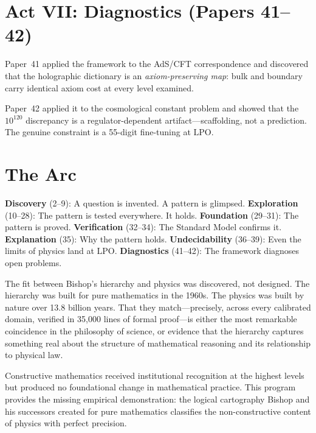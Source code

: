 \documentclass[11pt,a4paper]{report}
\theoremstyle{plain}
\theoremstyle{definition}
\theoremstyle{remark}
\newcommand{\LPO}{\mathrm{LPO}}
\begin{document}
\section*{Act VII: Diagnostics (Papers 41--42)}

Paper~41 applied the framework to the AdS/CFT correspondence and discovered that the holographic dictionary is an \emph{axiom-preserving map}: bulk and boundary carry identical axiom cost at every level examined.

Paper~42 applied it to the cosmological constant problem and showed that the $10^{120}$ discrepancy is a regulator-dependent artifact---scaffolding, not a prediction. The genuine constraint is a 55-digit fine-tuning at $\LPO$.

\section*{The Arc}

\textbf{Discovery} (2--9): A question is invented. A pattern is glimpsed. \textbf{Exploration} (10--28): The pattern is tested everywhere. It holds. \textbf{Foundation} (29--31): The pattern is proved. \textbf{Verification} (32--34): The Standard Model confirms it. \textbf{Explanation} (35): Why the pattern holds. \textbf{Undecidability} (36--39): Even the limits of physics land at $\LPO$. \textbf{Diagnostics} (41--42): The framework diagnoses open problems.

The fit between Bishop's hierarchy and physics was discovered, not designed. The hierarchy was built for pure mathematics in the 1960s. The physics was built by nature over 13.8 billion years. That they match---precisely, across every calibrated domain, verified in 35{,}000 lines of formal proof---is either the most remarkable coincidence in the philosophy of science, or evidence that the hierarchy captures something real about the structure of mathematical reasoning and its relationship to physical law.

\begin{chapterbox}
Constructive mathematics received institutional recognition at the highest levels but produced no foundational change in mathematical practice. This program provides the missing empirical demonstration: the logical cartography Bishop and his successors created for pure mathematics classifies the non-constructive content of physics with perfect precision.
\end{chapterbox}

\end{document}

